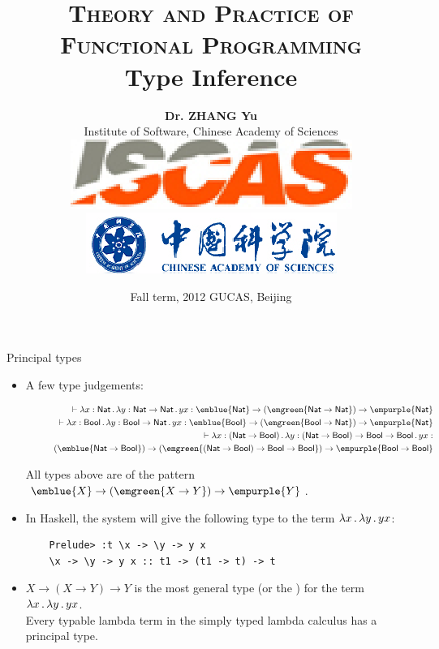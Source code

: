 \documentclass[paper=screen,mode=present,style=zysimple]{powerdot}
\title{{\small \textsc{Theory and Practice of Functional Programming}}
\\[12pt]
{\Large \color{TitleColor} Type Inference}
}
\author{\small \textbf{Dr. ZHANG Yu}
  \\[2pt] \small Institute of Software, Chinese Academy of Sciences 
  \\[5pt] \includegraphics[height=.04\slideheight]{iscas.eps} 
  \qquad \qquad 
  \includegraphics[height=.04\slideheight]{cas.eps}
}
\date{\scriptsize Fall term, 2012 \qquad GUCAS, Beijing}
\begin{document}
\maketitle 

\begin{slide}[method=direct]{Principal types}
\begin{itemize}
\item A few type judgements:
\begin{smalltext}
\begin{eqnarray*} 
&& 
\vdash \lambda x : \tnat \ldot \lambda y : \tnat \to \tnat \ldot y x : 
\emblue{\tnat} \to (\emgreen{\tnat \to \tnat}) \to \empurple{\tnat}
\\ && 
\vdash \lambda x : \tbool \ldot \lambda y : \tbool \to \tnat \ldot y x : 
\emblue{\tbool} \to (\emgreen{\tbool \to \tnat}) \to \empurple{\tnat}
\\ && 
\vdash \lambda x : (\tnat \to \tbool) \ldot \lambda y : (\tnat \to \tbool) \to \tbool \to \tbool \ldot y x : 
\\ && \qquad
(\emblue{\tnat \to \tbool}) \to (\emgreen{(\tnat \to \tbool) \to \tbool \to \tbool}) \to \empurple{\tbool \to \tbool}
\end{eqnarray*}
\end{smalltext}
All types above are of the pattern $\emblue{X} \to (\emgreen{X \to Y}) \to \empurple{Y}$.
\item In Haskell, the system will give the following type to the term $\lambda x \, . \, \lambda y \, . \, y x$:
\vspace*{-1.8em}
\begin{smalltext}
\begin{verbatim}
    Prelude> :t \x -> \y -> y x
    \x -> \y -> y x :: t1 -> (t1 -> t) -> t
\end{verbatim}
\end{smalltext}
\item $X \to (X \to Y) \to Y$ is the most general type (or the ) for the term 
$\lambda x \, . \, \lambda y \, . \, y x$.
\\
Every typable lambda term in the simply typed lambda calculus has a principal type.
\end{itemize}
\end{slide}
\end{document}
